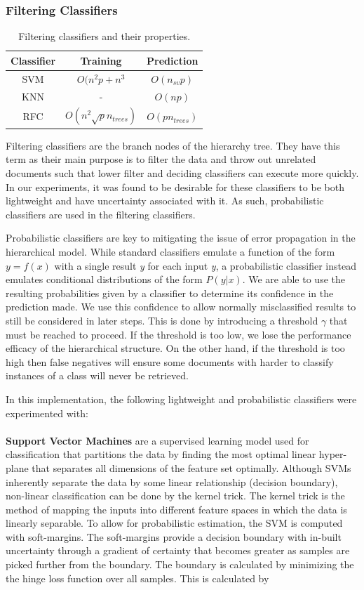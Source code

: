 \subsubsection{Filtering Classifiers}

\begin{table}[h]
    \begin{tabular}{c|cc}
        Classifier & Training & Prediction \\ \hline
        SVM & $O(n^2p+n^3$ & $O(n_{sv}p)$ \\
        KNN & - & $O(np)$ \\
        RFC & $O(n^2\sqrt{p}n_{trees})$ & $O(pn_{trees})$
    \end{tabular}
\caption{Filtering classifiers and their properties.}
\label{tab:filt-class}
\end{table}

Filtering classifiers are the branch nodes of the hierarchy tree. They have this term as their main purpose is to filter the data and throw out unrelated documents such that lower filter and deciding classifiers can execute more quickly. In our experiments, it was found to be desirable for these classifiers to be both lightweight and have uncertainty associated with it. As such, probabilistic classifiers are used in the filtering classifiers. 

Probabilistic classifiers are key to mitigating the issue of error propagation in the hierarchical model. While standard classifiers emulate a function of the form $y=f(x)$ with a single result \textit{y} for each input \textit{y}, a probabilistic classifier instead emulates conditional distributions of the form $P(y|x)$. We are able to use the resulting probabilities given by a classifier to determine its confidence in the prediction made. We use this confidence to allow normally misclassified results to still be considered in later steps. This is done by introducing a threshold $\gamma$ that must be reached to proceed. If the threshold is too low, we lose the performance efficacy of the hierarchical structure. On the other hand, if the threshold is too high then false negatives will ensure some documents with harder to classify instances of a class will never be retrieved.

In this implementation, the following lightweight and probabilistic classifiers were experimented with:
\\
\\
\textbf{Support Vector Machines} are a supervised learning model used for classification that partitions the data by finding the most optimal linear hyper-plane that separates all dimensions of the feature set optimally. Although SVMs inherently separate the data by some linear relationship (decision boundary), non-linear classification can be done by the kernel trick. The kernel trick is the method of mapping the inputs into different feature spaces in which the data is linearly separable. To allow for probabilistic estimation, the SVM is computed with soft-margins. The soft-margins provide a decision boundary with in-built uncertainty through a gradient of certainty that becomes greater as samples are picked further from the boundary. The boundary is calculated by minimizing the the hinge loss function over all samples. This is calculated by

